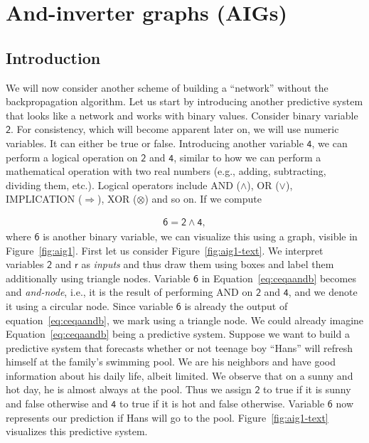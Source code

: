 \section{And-inverter graphs (AIGs)}

\subsection{Introduction}
We will now consider another scheme of building a \enquote{network} without the backpropagation algorithm. Let us start by introducing another predictive system that looks like a network and works with binary values. Consider binary variable $\mathsf{2}$. For consistency, which will become apparent later on, we will use numeric variables. It can either be true or false. Introducing another variable $\mathsf{4}$, we can perform a logical operation on $\mathsf{2}$ and $\mathsf{4}$, similar to how we can perform a mathematical operation with two real numbers (e.g., adding, subtracting, dividing them, etc.). Logical operators include AND ($\wedge$), OR ($\vee$), IMPLICATION ($\Rightarrow$), XOR ($\otimes$) and so on. If we compute

\begin{align} \label{eq:ceqaandb}
    \mathsf{6} = \mathsf{2} \wedge \mathsf{4},
  \end{align}where $\mathsf{6}$ is another binary variable, we can visualize this using a graph, visible in Figure~\ref{fig:aig1}. First let us consider Figure~\ref{fig:aig1-text}. We interpret variables $\mathsf{2}$ and $\mathsf{r}$ as \textit{inputs} and thus draw them using boxes and label them additionally using triangle nodes. Variable $\mathsf{6}$ in Equation~\ref{eq:ceqaandb} becomes and \textit{and-node}, i.e., it is the result of performing AND on $\mathsf{2}$ and $\mathsf{4}$, and we denote it using a circular node. Since variable $\mathsf{6}$ is already the output of equation~\ref{eq:ceqaandb}, we mark using a triangle node. We could already imagine Equation~\ref{eq:ceqaandb} being a predictive system. Suppose we want to build a predictive system that forecasts whether or not teenage boy \enquote{Hans} will refresh himself at the family's swimming pool. We are his neighbors and have good information about his daily life, albeit limited. We observe that on a sunny and hot day, he is almost always at the pool. Thus we assign $\mathsf{2}$ to true if it is sunny and false otherwise and $\mathsf{4}$ to true if it is hot and false otherwise. Variable $\mathsf{6}$ now represents our prediction if Hans will go to the pool. Figure~\ref{fig:aig1-text} visualizes this predictive system.

